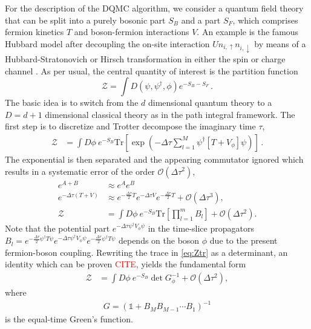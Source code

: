 \documentclass[%
 reprint,
superscriptaddress,
showpacs,
 amsmath,amssymb,
 aps,
 prb,
longbibliography,
]{revtex4-1}
\begin{document}
For the description of the DQMC algorithm, we consider a quantum field theory that can be split into a purely bosonic part $S_B$ and a part $S_F$, which comprises fermion kinetics $T$ and boson-fermion interactions $V$. An example is the famous Hubbard model after decoupling the on-site
interaction $U n_{i, \uparrow} n_{i, \downarrow}$ by means of a Hubbard-Stratonovich or Hirsch transformation in either the spin or charge channel \cite{Hirsch1983}. As per usual, the central quantity of interest is the partition function
%
\begin{equation}
\mathcal{Z} = \int D\left( \psi, \psi^\dagger, \phi \right) e^{-S_B - S_F} \,.
\end{equation}
%
The basic idea is to switch from the $d$ dimensional quantum theory to a $D = d + 1$ dimensional classical theory as in the path integral framework. The first step is to discretize and Trotter decompose the imaginary time $\tau$,
%
\begin{align}
	\mathcal{Z} &= \int D\phi \ e^{-S_B} \mathrm{Tr}{\left[\exp{\left( -\Delta\tau \sum_{l=1}^M \psi^\dagger \left[T + V_\phi\right] \psi \right)}\right]} \label{eq:discretizedpi} \,.
\end{align}
%
The exponential is then separated and the appearing commutator ignored which results in a systematic error of the order $\mathcal{O}\left(\Delta\tau^2\right)$,
\begin{align}
	e^{A + B} &\approx e^A e^B \quad \nonumber\\
	e^{-\Delta\tau (T + V)} &\approx e^{- \frac{\Delta\tau}{2}T} e^{-\Delta\tau V} e^{- \frac{\Delta\tau}{2}T} + \mathcal{O}\left(\Delta\tau^3\right), \nonumber\\
	\mathcal{Z} &= \int D\phi \ e^{-S_B} \mathrm{Tr}{\left[ \prod_{l=1}^{m} B_l \right]} + \mathcal{O}\left(\Delta\tau^2\right). \label{eq:Ztr}
\end{align}
%
Note that the potential part $e^{-\Delta\tau \psi^\dagger V_\phi \psi}$ in the time-slice propagators $B_l = e^{- \frac{\Delta\tau}{2}\psi^\dagger T \psi} e^{-\Delta\tau \psi^\dagger V_\phi \psi} e^{- \frac{\Delta\tau}{2}\psi^\dagger T \psi}$ depends on the boson $\phi$ due to the present fermion-boson coupling. Rewriting the trace in \eqref{eq:Ztr} as a determinant, an identity which can be proven \textcolor{red}{CITE}, yields the fundamental form
%
\begin{align}
	\mathcal{Z} &= \int D\phi \ e^{-S_B} \det{G_\phi^{-1}} + \mathcal{O}\left(\Delta\tau^2\right),
\end{align}
%
where
\begin{align}
	G = \left( \mathbb{1} + B_M B_{M-1} \cdots B_1 \right)^{-1} \label{etgf}
\end{align}
is the equal-time Green's function.
\end{document}
